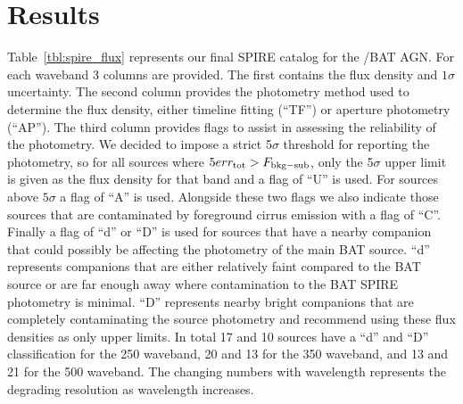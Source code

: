 \section{Results}
Table~\ref{tbl:spire_flux} represents our final SPIRE catalog for the \swift/BAT AGN. For each waveband 3 columns are provided. The first contains the flux density and $1\sigma$ uncertainty. The second column provides the photometry method used to determine the flux density, either timeline fitting (``TF'') or aperture photometry (``AP''). The third column provides flags to assist in assessing the reliability of the photometry. We decided to impose a strict 5$\sigma$ threshold for reporting the photometry, so for all sources where $5 err_{\rm{tot}} > F_{\rm{bkg-sub}}$, only the 5$\sigma$ upper limit is given as the flux density for that band and a flag of ``U'' is used. For sources above $5\sigma$ a flag of ``A'' is used. Alongside these two flags we also indicate those sources that are contaminated by foreground cirrus emission with a flag of ``C''. Finally a flag of ``d'' or ``D'' is used for sources that have a nearby companion that could possibly be affecting the photometry of the main BAT source. ``d'' represents companions that are either relatively faint compared to the BAT source or are far enough away where contamination to the BAT SPIRE photometry is minimal. ``D'' represents nearby bright companions that are completely contaminating the source photometry and recommend using these flux densities as only upper limits. In total 17 and 10 sources have a ``d'' and ``D'' classification for the 250 \um{} waveband, 20 and 13 for the 350 \um{} waveband, and 13 and 21 for the 500 \um{} waveband. The changing numbers with wavelength represents the degrading resolution as wavelength increases.
  
  